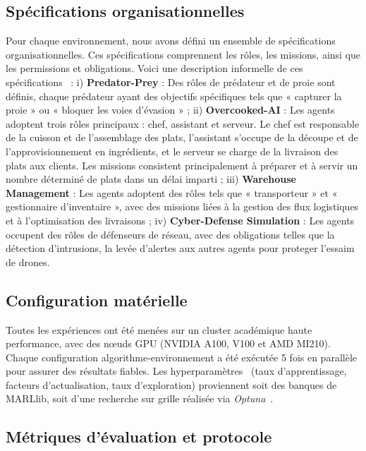 \documentclass[final]{jfsma}
\begin{document}
\subsection{Spécifications organisationnelles}

Pour chaque environnement, nous avons défini un ensemble de spécifications organisationnelles. Ces spécifications comprennent les rôles, les missions, ainsi que les permissions et obligations. Voici une description informelle de ces spécifications~\hyperref[fn:github]{\footnotemark[2]} :
%
i) \textbf{Predator-Prey} : Des rôles de prédateur et de proie sont définis, chaque prédateur ayant des objectifs spécifiques tels que « capturer la proie » ou « bloquer les voies d'évasion »
; \quad
ii) \textbf{Overcooked-AI} : Les agents adoptent trois rôles principaux : chef, assistant et serveur. Le chef est responsable de la cuisson et de l'assemblage des plats, l'assistant s'occupe de la découpe et de l'approvisionnement en ingrédients, et le serveur se charge de la livraison des plats aux clients. Les missions consistent principalement à préparer et à servir un nombre déterminé de plats dans un délai imparti
; \quad
iii) \textbf{Warehouse Management} : Les agents adoptent des rôles tels que « transporteur » et « gestionnaire d'inventaire », avec des missions liées à la gestion des flux logistiques et à l'optimisation des livraisons
; \quad
iv) \textbf{Cyber-Defense Simulation} : Les agents occupent des rôles de défenseurs de réseau, avec des obligations telles que la détection d'intrusions, la levée d'alertes aux autres agents pour proteger l'essaim de drones.

\subsection{Configuration matérielle}

Toutes les expériences ont été menées sur un cluster académique haute performance, avec des nœuds GPU (NVIDIA A100, V100 et AMD MI210). Chaque configuration algorithme-environnement a été exécutée 5 fois en parallèle pour assurer des résultats fiables.
Les hyperparamètres~\hyperref[fn:github]{\footnotemark[2]} (taux d'apprentissage, facteurs d'actualisation, taux d'exploration) proviennent soit des banques de MARLlib, soit d’une recherche sur grille réalisée via \textit{Optuna}~\cite{akiba2019optuna}.

\subsection{Métriques d'évaluation et protocole}
\end{document}
